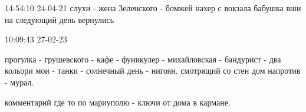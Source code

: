  
 
 
 
 

14:54:10 24-04-21
слухи - жена Зеленского - бомжей нахер с вокзала бабушка
вши на следующий день вернулись

10:09:43 27-02-23

прогулка - грушевского - кафе - фуникулер - михайловская - бандурист - два
кольори мои - танки - солнечный день - нигоян, смотрящий со стен дом напротив -
мурал.

комментарий где то по мариуполю - ключи от дома в кармане.

